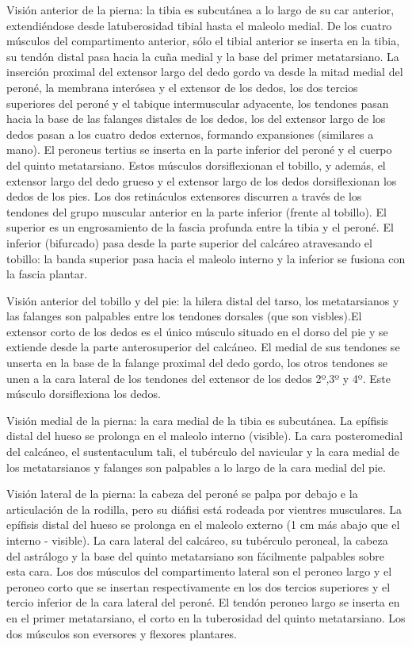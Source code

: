 \documentclass[a4paper,12pt]{article} %
\begin{document}
Visión anterior de la pierna: la tibia es subcutánea a lo largo de su car anterior, extendiéndose desde latuberosidad tibial hasta el maleolo medial. De los cuatro músculos del compartimento anterior, sólo el tibial anterior se inserta en la tibia, su tendón distal pasa hacia la cuña medial y la base del primer metatarsiano. La inserción proximal del extensor largo del dedo gordo va desde la mitad medial del peroné, la membrana interósea y el extensor de los dedos, los dos tercios superiores del peroné y el tabique intermuscular adyacente, los tendones pasan hacia la base de las falanges distales de los dedos, los del extensor largo de los dedos pasan a los cuatro dedos externos, formando expansiones (similares a mano). El peroneus tertius se inserta en la parte inferior del peroné y el cuerpo del quinto metatarsiano. Estos músculos dorsiflexionan el tobillo, y además, el extensor largo del dedo grueso y el extensor largo de los dedos dorsiflexionan los dedos de los pies.
Los dos retináculos extensores discurren a través de los tendones del grupo muscular anterior en la parte inferior (frente al tobillo). El superior es un engrosamiento de la fascia profunda entre la tibia y el peroné. El inferior (bifurcado) pasa desde la parte superior del calcáreo atravesando el tobillo: la banda superior pasa hacia el maleolo interno y la inferior se fusiona con la fascia plantar.

Visión anterior del tobillo y del pie: la hilera distal del tarso, los metatarsianos y las falanges son palpables entre los tendones dorsales (que son visbles).El extensor corto de los dedos es el único músculo situado en el dorso del pie y se extiende desde la parte anterosuperior del calcáneo. El medial de sus tendones se unserta en la base de la falange proximal del dedo gordo, los otros tendones se unen a la cara lateral de los tendones del extensor de los dedos 2º,3º y 4º. Este músculo dorsiflexiona los dedos.

Visión medial de la pierna: la cara medial de la tibia es subcutánea. La epífisis distal del hueso se prolonga en el maleolo interno (visible). La cara posteromedial del calcáneo, el sustentaculum tali, el tubérculo del navicular y la cara medial de los metatarsianos y falanges son palpables a lo largo de la cara medial del pie.

Visión lateral de la pierna: la cabeza del peroné se palpa por debajo e la articulación de la rodilla, pero su diáfisi está rodeada por vientres musculares. La epífisis distal del hueso se prolonga en el maleolo externo (1 cm más abajo que el interno - visible). La cara lateral del calcáreo, su tubérculo peroneal, la cabeza del astrálogo y la base del quinto metatarsiano son fácilmente palpables sobre esta cara. Los dos músculos del compartimento lateral son el peroneo largo y el peroneo corto que se insertan respectivamente en los dos tercios superiores y el tercio inferior de la cara lateral del peroné. El tendón peroneo largo se inserta en en el primer metatarsiano, el corto  en la tuberosidad del quinto metatarsiano. Los dos músculos son eversores y flexores plantares.
\end{document}
